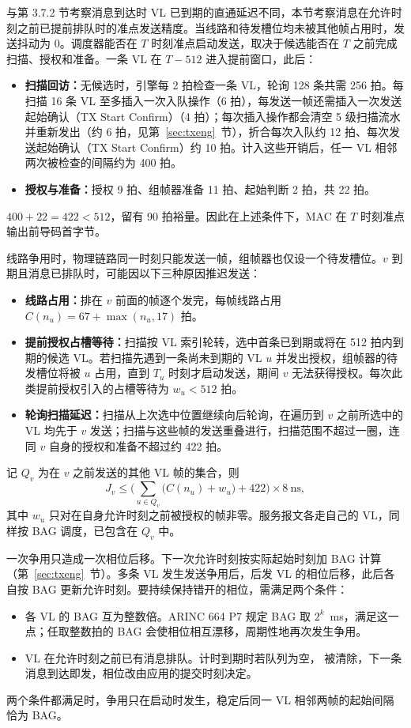 与第 3.7.2 节考察消息到达时 VL 已到期的直通延迟不同，本节考察消息在允许时刻之前已提前排队时的准点发送精度。当线路和待发槽位均未被其他帧占用时，发送抖动为 0。调度器能否在 $T$ 时刻准点启动发送，取决于候选能否在 $T$ 之前完成扫描、授权和准备。一条 VL 在 $T-512$ 进入提前窗口，此后：
\begin{itemize}
  \item \textbf{扫描回访：}无候选时，引擎每 2 拍检查一条 VL，轮询 128 条共需 256 拍。每扫描 16 条 VL 至多插入一次入队操作（6 拍），每发送一帧还需插入一次发送起始确认（TX Start Confirm）（4 拍）；每次插入操作都会清空 5 级扫描流水并重新发出（约 6 拍，见第~\ref{sec:txeng}~节），折合每次入队约 12 拍、每次发送起始确认（TX Start Confirm）约 10 拍。计入这些开销后，任一 VL 相邻两次被检查的间隔约为 400 拍。
  \item \textbf{授权与准备：}授权 9 拍、组帧器准备 11 拍、起始判断 2 拍，共 22 拍。
\end{itemize}
$400 + 22 = 422 < 512$，留有 90 拍裕量。因此在上述条件下，MAC 在 $T$ 时刻准点输出前导码首字节。

线路争用时，物理链路同一时刻只能发送一帧，组帧器也仅设一个待发槽位。$v$ 到期且消息已排队时，可能因以下三种原因推迟发送：
\begin{itemize}
  \item \textbf{线路占用：}排在 $v$ 前面的帧逐个发完，每帧线路占用 $C(n_u)=67+\max(n_u,17)$ 拍。
  \item \textbf{提前授权占槽等待：}扫描按 VL 索引轮转，选中首条已到期或将在 512 拍内到期的候选 VL。若扫描先遇到一条尚未到期的 VL $u$ 并发出授权，组帧器的待发槽位将被 $u$ 占用，直到 $T_u$ 时刻才启动发送，期间 $v$ 无法获得授权。每次此类提前授权引入的占槽等待为 $w_u < 512$ 拍。
  \item \textbf{轮询扫描延迟：}扫描从上次选中位置继续向后轮询，在遍历到 $v$ 之前所选中的 VL 均先于 $v$ 发送；扫描与这些帧的发送重叠进行，扫描范围不超过一圈，连同 $v$ 自身的授权和准备不超过约 422 拍。
\end{itemize}
记 $Q_v$ 为在 $v$ 之前发送的其他 VL 帧的集合，则
\begin{equation}
J_v \le \Big(\sum_{u \in Q_v} \big(C(n_u) + w_u\big) + 422\Big) \times 8~\text{ns},
\label{eq:jitter}
\end{equation}
其中 $w_u$ 只对在自身允许时刻之前被授权的帧非零。服务报文各走自己的 VL，同样按 BAG 调度，已包含在 $Q_v$ 中。

一次争用只造成一次相位后移。下一次允许时刻按实际起始时刻加 BAG 计算（第~\ref{sec:txeng}~节）。多条 VL 发生发送争用后，后发 VL 的相位后移，此后各自按 BAG 更新允许时刻。要持续保持错开的相位，需满足两个条件：
\begin{itemize}
  \item 各 VL 的 BAG 互为整数倍。ARINC 664 P7 规定 BAG 取 $2^k$~ms，满足这一点；任取整数拍的 BAG 会使相位相互漂移，周期性地再次发生争用。
  \item VL 在允许时刻之前已有消息排队。计时到期时若队列为空， 被清除，下一条消息到达即发，相位改由应用的提交时刻决定。
\end{itemize}
两个条件都满足时，争用只在启动时发生，稳定后同一 VL 相邻两帧的起始间隔恰为 BAG。

